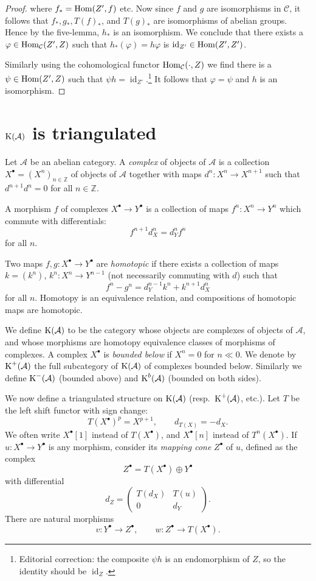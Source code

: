 \begin{proof}
	where $f_* = \operatorname{Hom}(Z', f)$ etc. Now since $f$ and $g$ are isomorphisms in $\mathcal{C}$, it follows that $f_*, g_*, T(f)_*$, and $T(g)_*$ are isomorphisms of abelian groups. Hence by the five-lemma, $h_*$ is an isomorphism. We conclude that there exists a $\varphi \in \operatorname{Hom}_{\mathcal{C}}(Z',Z)$ such that $h_*(\varphi) = h\varphi$ is $\operatorname{id}_{Z'} \in \operatorname{Hom}(Z',Z')$.

	Similarly using the cohomological functor $\operatorname{Hom}_{\mathcal{C}}(\cdot, Z)$ we find there is a $\psi \in \operatorname{Hom}(Z',Z)$ such that $\psi h = \operatorname{id}_{Z'}$.\footnote{Editorial correction: the composite $\psi h$ is an endomorphism of $Z$, so the identity should be $\operatorname{id}_Z$.} It follows that $\varphi = \psi$ and $h$ is an isomorphism.\qedhere

\end{proof}

\section{$\operatorname{K}(\mathcal{A})$ is triangulated}\label{sec:1.2}
Let $\mathcal{A}$ be an abelian category. A \emph{complex} of objects of $\mathcal{A}$ is a collection $X^\bullet=(X^n)_{n\in\mathbb{Z}}$ of objects of $\mathcal{A}$ together with maps $d^n\colon X^n\to X^{n+1}$ such that $d^{n+1}d^n=0$ for all $n\in\mathbb{Z}$.

A morphism $f$ of complexes $X^\bullet\to Y^\bullet$ is a collection of maps $f^n\colon X^n\to Y^n$ which commute with differentials:
\[
f^{n+1}d_X^n = d_Y^n f^n
\]
for all $n$.

Two maps $f,g\colon X^\bullet\to Y^\bullet$ are \emph{homotopic} if there exists a collection of maps $k=(k^n)$, $k^n\colon X^n\to Y^{n-1}$ (not necessarily commuting with $d$) such that
\[
f^n - g^n = d_Y^{n-1}k^n + k^{n+1}d_X^n
\]
for all $n$. Homotopy is an equivalence relation, and compositions of homotopic maps are homotopic.

We define $\operatorname{K}(\mathcal{A})$ to be the category whose objects are complexes of objects of $\mathcal{A}$, and whose morphisms are homotopy equivalence classes of morphisms of complexes. A complex $X^\bullet$ is \emph{bounded below} if $X^n=0$ for $n\ll0$. We denote by $\operatorname{K}^+(\mathcal{A})$ the full subcategory of $\operatorname{K}(\mathcal{A})$ of complexes bounded below. Similarly we define $\operatorname{K}^-(\mathcal{A})$ (bounded above) and $\operatorname{K}^b(\mathcal{A})$ (bounded on both sides).

We now define a triangulated structure on $\operatorname{K}(\mathcal{A})$ (resp.\ $\operatorname{K}^+(\mathcal{A})$, etc.). Let $T$ be the left shift functor with sign change:
\[
T(X^\bullet)^p = X^{p+1},\qquad d_{T(X)} = -d_X.
\]
We often write $X^\bullet[1]$ instead of $T(X^\bullet)$, and $X^\bullet[n]$ instead of $T^n(X^\bullet)$. If $u\colon X^\bullet\to Y^\bullet$ is any morphism, consider its \emph{mapping cone} $Z^\bullet$ of $u$, defined as the complex
\[
Z^\bullet = T(X^\bullet)\oplus Y^\bullet
\]
with differential
\[
d_Z = \begin{pmatrix} T(d_X) & T(u) \\ 0 & d_Y \end{pmatrix}.
\]
There are natural morphisms
\[
v\colon Y^\bullet\to Z^\bullet,\qquad w\colon Z^\bullet\to T(X^\bullet).
\]

